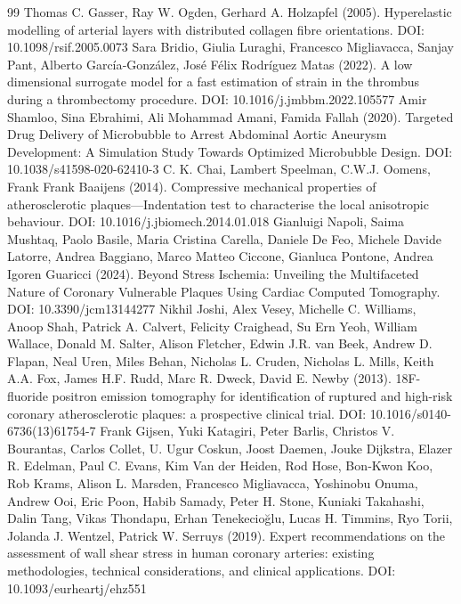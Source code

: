 \documentclass[preprint,12pt]{elsarticle}
\begin{document}
\begin{thebibliography}{99}
 Thomas C. Gasser, Ray W. Ogden, Gerhard A. Holzapfel (2005). Hyperelastic modelling of arterial layers with distributed collagen fibre orientations. DOI: 10.1098/rsif.2005.0073
 Sara Bridio, Giulia Luraghi, Francesco Migliavacca, Sanjay Pant, Alberto García‐González, José Félix Rodríguez Matas (2022). A low dimensional surrogate model for a fast estimation of strain in the thrombus during a thrombectomy procedure. DOI: 10.1016/j.jmbbm.2022.105577
 Amir Shamloo, Sina Ebrahimi, Ali Mohammad Amani, Famida Fallah (2020). Targeted Drug Delivery of Microbubble to Arrest Abdominal Aortic Aneurysm Development: A Simulation Study Towards Optimized Microbubble Design. DOI: 10.1038/s41598-020-62410-3
 C. K. Chai, Lambert Speelman, C.W.J. Oomens, Frank Frank Baaijens (2014). Compressive mechanical properties of atherosclerotic plaques—Indentation test to characterise the local anisotropic behaviour. DOI: 10.1016/j.jbiomech.2014.01.018
 Gianluigi Napoli, Saima Mushtaq, Paolo Basile, Maria Cristina Carella, Daniele De Feo, Michele Davide Latorre, Andrea Baggiano, Marco Matteo Ciccone, Gianluca Pontone, Andrea Igoren Guaricci (2024). Beyond Stress Ischemia: Unveiling the Multifaceted Nature of Coronary Vulnerable Plaques Using Cardiac Computed Tomography. DOI: 10.3390/jcm13144277
 Nikhil Joshi, Alex Vesey, Michelle C. Williams, Anoop Shah, Patrick A. Calvert, Felicity Craighead, Su Ern Yeoh, William Wallace, Donald M. Salter, Alison Fletcher, Edwin J.R. van Beek, Andrew D. Flapan, Neal Uren, Miles Behan, Nicholas L. Cruden, Nicholas L. Mills, Keith A.A. Fox, James H.F. Rudd, Marc R. Dweck, David E. Newby (2013). 18F-fluoride positron emission tomography for identification of ruptured and high-risk coronary atherosclerotic plaques: a prospective clinical trial. DOI: 10.1016/s0140-6736(13)61754-7
 Frank Gijsen, Yuki Katagiri, Peter Barlis, Christos V. Bourantas, Carlos Collet, U. Ugur Coskun, Joost Daemen, Jouke Dijkstra, Elazer R. Edelman, Paul C. Evans, Kim Van der Heiden, Rod Hose, Bon‐Kwon Koo, Rob Krams, Alison L. Marsden, Francesco Migliavacca, Yoshinobu Onuma, Andrew Ooi, Eric Poon, Habib Samady, Peter H. Stone, Kuniaki Takahashi, Dalin Tang, Vikas Thondapu, Erhan Tenekecioğlu, Lucas H. Timmins, Ryo Torii, Jolanda J. Wentzel, Patrick W. Serruys (2019). Expert recommendations on the assessment of wall shear stress in human coronary arteries: existing methodologies, technical considerations, and clinical applications. DOI: 10.1093/eurheartj/ehz551

\end{thebibliography}
\end{document}
